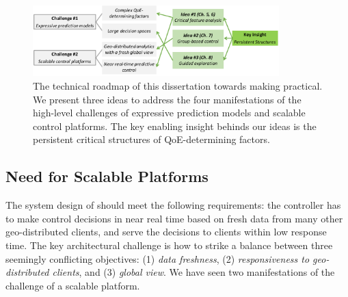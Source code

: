 \begin{figure}[t!]
\centering
\includegraphics[width=0.85\textwidth]{figures/overview-roadmap.pdf}
\caption{
The technical roadmap of this dissertation towards making \ddn practical. We present three 
ideas to address the four manifestations of the high-level challenges of expressive prediction
models and scalable control platforms. The key enabling insight behinds our ideas is the 
persistent critical structures of QoE-determining factors. 
}
\label{fig:overview-roadmap}
\end{figure}



\subsection{Need for Scalable Platforms}
\label{subsec:overview:challenge2}

The system design of \ddn should meet the following requirements:
the \ddn controller has to make control decisions 
in near real time based on fresh data from many
other geo-distributed clients, and serve the decisions 
to clients within low response time.
The key architectural challenge is how to strike a balance between 
three seemingly conflicting objectives: 
(1) {\em data freshness}, 
(2) {\em responsiveness to geo-distributed clients},
and (3) {\em global view}.
We have seen two manifestations of the challenge of a scalable platform.


